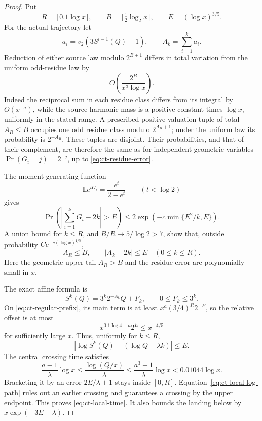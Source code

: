 \documentclass[11pt,a4paper]{article}
\begin{document}
\begin{proof}
Put
\[
 R=\lfloor0.1\log x\rfloor,\qquad
 B=\lfloor\tfrac12\log_2x\rfloor,\qquad
 E=(\log x)^{3/5}.
\]
For the actual trajectory let
\[
 a_i=v_2(3S^{i-1}(Q)+1),\qquad A_k=\sum_{i=1}^k a_i.
\]
Reduction of either source law modulo \(2^{B+1}\) differs in total
variation from the uniform odd-residue law by
\begin{equation}\label{eq:ct-residue-error}
 O\!\left(\frac{2^B}{x^a\log x}\right).
\end{equation}
Indeed the reciprocal sum in each residue class differs from its
integral by \(O(x^{-a})\), while the source harmonic mass is a
positive constant times \(\log x\), uniformly in the stated range.
A prescribed positive valuation tuple of total \(A_R\le B\)
occupies one odd residue class modulo \(2^{A_R+1}\); under the
uniform law its probability is \(2^{-A_R}\). These tuples are
disjoint. Their probabilities, and that of their complement, are
therefore the same as for independent geometric variables
\(\Pr(G_i=j)=2^{-j}\), up to \eqref{eq:ct-residue-error}.

The moment generating function
\[
 \mathbb E e^{tG_i}=\frac{e^t}{2-e^t}\qquad(t<\log2)
\]
gives
\[
 \Pr\left(\left|\sum_{i=1}^kG_i-2k\right|>E\right)
 \le2\exp\!\left(-c\min\{E^2/k,E\}\right).
\]
A union bound for \(k\le R\), and \(B/R\to5/\log2>7\), show
that, outside probability \(Ce^{-c(\log x)^{1/5}}\),
\begin{equation}\label{eq:ct-regular-prefix}
 A_R\le B,\qquad |A_k-2k|\le E\quad(0\le k\le R).
\end{equation}
Here the geometric upper tail \(A_R>B\) and the residue error are
polynomially small in \(x\).

The exact affine formula is
\[
 S^k(Q)=3^k2^{-A_k}Q+F_k,\qquad 0\le F_k\le3^k.
\]
On \eqref{eq:ct-regular-prefix}, its main term is at least
\(x^a(3/4)^R2^{-E}\), so the relative offset is at most
\[
 x^{0.1\log4-a}2^E\le x^{-4/5}
\]
for sufficiently large \(x\). Thus, uniformly for \(k\le R\),
\begin{equation}\label{eq:ct-local-log-path}
 \left|\log S^k(Q)-(\log Q-\lambda k)\right|\le E.
\end{equation}
The central crossing time satisfies
\[
 \frac{a-1}{\lambda}\log x
 \le \frac{\log(Q/x)}{\lambda}
 \le\frac{a^3-1}{\lambda}\log x
 <0.01044\log x.
\]
Bracketing it by an error \(2E/\lambda+1\) stays inside
\([0,R]\). Equation~\eqref{eq:ct-local-log-path} rules out an
earlier crossing and guarantees a crossing by the upper endpoint.
This proves \eqref{eq:ct-local-time}. It also bounds the landing
below by \(x\exp(-3E-\lambda)\).


\end{proof}
\end{document}
